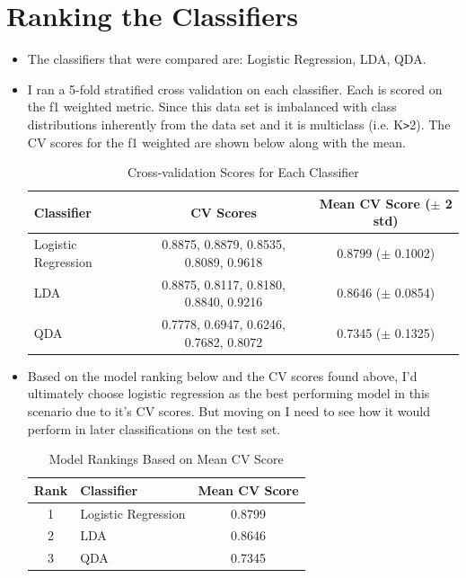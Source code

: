 \documentclass[12pt]{article}
\begin{document}
\section{Ranking the Classifiers}
\begin{itemize}
    \item The classifiers that were compared are: Logistic Regression, LDA, QDA.
    \item I ran a 5-fold stratified cross validation on each classifier. Each is scored on the f1 weighted metric. Since this data set is imbalanced with class distributions inherently from the data set and it is multiclass (i.e. K\texttt{>}2). The CV scores for the f1 weighted are shown below along with the mean.
\begin{table}[h!]
\centering

\begin{tabular}{lcc}
\hline
Classifier           & CV Scores & Mean CV Score ($\pm$ 2 std) \\
\hline
Logistic Regression  & 0.8875, 0.8879, 0.8535, 0.8089, 0.9618 & 0.8799 ($\pm$ 0.1002) \\
LDA                  & 0.8875, 0.8117, 0.8180, 0.8840, 0.9216 & 0.8646 ($\pm$ 0.0854) \\
QDA                  & 0.7778, 0.6947, 0.6246, 0.7682, 0.8072 & 0.7345 ($\pm$ 0.1325) \\
\hline
\end{tabular}
\caption{Cross-validation Scores for Each Classifier}
\end{table}
\item Based on the model ranking below and the CV scores found above, I'd ultimately choose logistic regression as the best performing model in this scenario due to it's CV scores. But moving on I need to see how it would perform in later classifications on the test set.
\begin{table}[h!]
\centering

\begin{tabular}{clc}
\hline
Rank & Classifier           & Mean CV Score \\
\hline
1    & Logistic Regression  & 0.8799 \\
2    & LDA                  & 0.8646 \\
3    & QDA                  & 0.7345 \\
\hline
\end{tabular}
\caption{Model Rankings Based on Mean CV Score}
\end{table}
    
\end{itemize}
\end{document}
